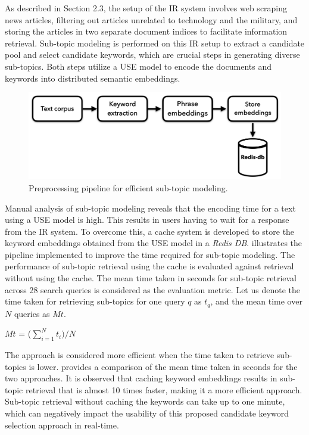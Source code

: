 As described in Section 2.3, the setup of the \ac{IR} system involves web scraping news articles, filtering out articles unrelated to technology and the military, and storing the articles in two separate document indices to facilitate information retrieval. Sub-topic modeling is performed on this \ac{IR} setup to extract a candidate pool and select candidate keywords, which are crucial steps in generating diverse sub-topics. Both steps utilize a \ac{USE} model to encode the documents and keywords into distributed semantic embeddings.


\begin{figure}[h]
	\centering
	\includegraphics[width=.9\textwidth]{images/thesis_images/redisdb.png}
	\caption[Pjpeline for efficient sub-topics.]{Preprocessing pipeline for efficient sub-topic modeling. \label{fig:redis_db}}
\end{figure}

Manual analysis of sub-topic modeling reveals that the encoding time for a text using a \ac{USE} model is high. This results in users having to wait for a response from the \ac{IR} system. To overcome this, a cache system is developed to store the keyword embeddings obtained from the \ac{USE} model in a \emph{Redis DB}.  illustrates the pipeline implemented to improve the time required for sub-topic modeling. The performance of sub-topic retrieval using the cache is evaluated against retrieval without using the cache. The mean time taken in seconds for sub-topic retrieval across 28 search queries is considered as the evaluation metric. Let us denote the time taken for retrieving sub-topics for one query $q$ as $t_q$, and the mean time over $N$ queries as $Mt$.


\centerline{$Mt$ = ($\sum\limits_{i=1}^N t_i) /N$}

The approach is considered more efficient when the time taken to retrieve sub-topics is lower.  provides a comparison of the mean time taken in seconds for the two approaches. It is observed that caching keyword embeddings results in sub-topic retrieval that is almost 10 times faster, making it a more efficient approach. Sub-topic retrieval without caching the keywords can take up to one minute, which can negatively impact the usability of this proposed candidate keyword selection approach in real-time.


